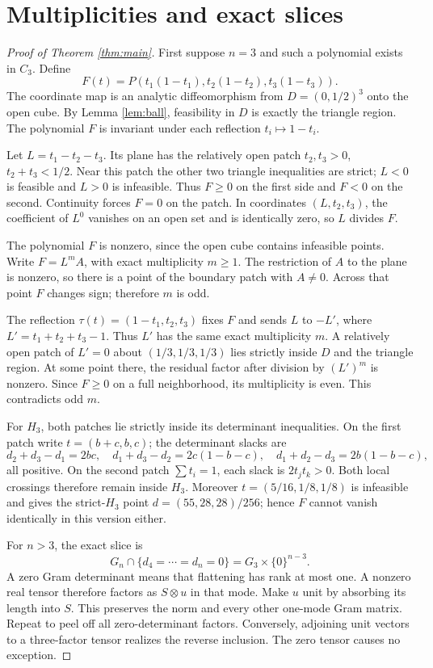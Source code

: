 \documentclass[11pt]{article}
\begin{document}
\section{Multiplicities and exact slices}
\begin{proof}[Proof of Theorem \ref{thm:main}]
First suppose \(n=3\) and such a polynomial exists in \(C_3\). Define
\[
 F(t)=P(t_1(1-t_1),t_2(1-t_2),t_3(1-t_3)).
\]
The coordinate map is an analytic diffeomorphism from \(D=(0,1/2)^3\) onto the open cube. By Lemma \ref{lem:ball}, feasibility in \(D\) is exactly the triangle region. The polynomial \(F\) is invariant under each reflection \(t_i\mapsto1-t_i\).

Let \(L=t_1-t_2-t_3\). Its plane has the relatively open patch \(t_2,t_3>0\), \(t_2+t_3<1/2\). Near this patch the other two triangle inequalities are strict; \(L<0\) is feasible and \(L>0\) is infeasible. Thus \(F\geq0\) on the first side and \(F<0\) on the second. Continuity forces \(F=0\) on the patch. In coordinates \((L,t_2,t_3)\), the coefficient of \(L^0\) vanishes on an open set and is identically zero, so \(L\) divides \(F\).

The polynomial \(F\) is nonzero, since the open cube contains infeasible points. Write \(F=L^m A\), with exact multiplicity \(m\geq1\). The restriction of \(A\) to the plane is nonzero, so there is a point of the boundary patch with \(A\ne0\). Across that point \(F\) changes sign; therefore \(m\) is odd.

The reflection \(\tau(t)=(1-t_1,t_2,t_3)\) fixes \(F\) and sends \(L\) to \(-L'\), where \(L'=t_1+t_2+t_3-1\). Thus \(L'\) has the same exact multiplicity \(m\). A relatively open patch of \(L'=0\) about \((1/3,1/3,1/3)\) lies strictly inside \(D\) and the triangle region. At some point there, the residual factor after division by \((L')^m\) is nonzero. Since \(F\geq0\) on a full neighborhood, its multiplicity is even. This contradicts odd \(m\).

For \(H_3\), both patches lie strictly inside its determinant inequalities. On the first patch write \(t=(b+c,b,c)\); the determinant slacks are
\[
 d_2+d_3-d_1=2bc,\quad d_1+d_3-d_2=2c(1-b-c),\quad
 d_1+d_2-d_3=2b(1-b-c),
\]
all positive. On the second patch \(\sum t_i=1\), each slack is \(2t_jt_k>0\). Both local crossings therefore remain inside \(H_3\).
Moreover \(t=(5/16,1/8,1/8)\) is infeasible and gives the strict-\(H_3\) point \(d=(55,28,28)/256\); hence \(F\) cannot vanish identically in this version either.

For \(n>3\), the exact slice is
\[
 G_n\cap\{d_4=\cdots=d_n=0\}=G_3\times\{0\}^{n-3}.
\]
A zero Gram determinant means that flattening has rank at most one. A nonzero real tensor therefore factors as \(S\otimes u\) in that mode. Make \(u\) unit by absorbing its length into \(S\). This preserves the norm and every other one-mode Gram matrix. Repeat to peel off all zero-determinant factors. Conversely, adjoining unit vectors to a three-factor tensor realizes the reverse inclusion. The zero tensor causes no exception.


\end{proof}
\end{document}
